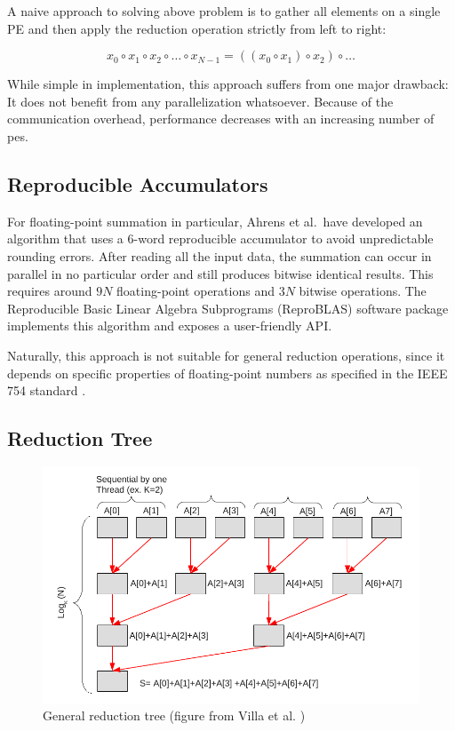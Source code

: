 A naive approach to solving above problem is to gather all elements on a single PE and then apply the reduction operation strictly from left to right:

\begin{equation}
x_0 \circ x_1 \circ x_2 \circ \ldots  \circ x_{N-1} = ((x_0 \circ x_1) \circ x_2) \circ \ldots
\end{equation}

While simple in implementation, this approach suffers from one major drawback:
It does not benefit from any parallelization whatsoever.
Because of the communication overhead, performance decreases with an increasing number of \glspl{pe}.


\subsection{Reproducible Accumulators}
\label{sec:Reproducible Accumulators}
For floating-point summation in particular, Ahrens et al.\ have developed an algorithm that uses a 6-word reproducible accumulator to avoid unpredictable rounding errors.\cite{ahrens_algorithms_2020}
After reading all the input data, the summation can occur in parallel in no particular order and still produces bitwise identical results.
This requires around $9N$ floating-point operations and $3N$ bitwise operations.
The Reproducible Basic Linear Algebra Subprograms (ReproBLAS) software package implements this algorithm and exposes a user-friendly API.\@

Naturally, this approach is not suitable for general reduction operations, since it depends on specific properties of floating-point numbers as specified in the IEEE 754 standard \cite{noauthor_ieee_nodate-1}.


\subsection{Reduction Tree}
\label{sec:ReductionTree}

\begin{figure}[H]
\centering
\includegraphics[scale=0.7]{figures/villa_et_al_reduction_tree.pdf}
\caption{General reduction tree (figure from Villa et al. \cite{villa_effects_2009})}
\label{fig:villa_reduction_tree}
\end{figure}



